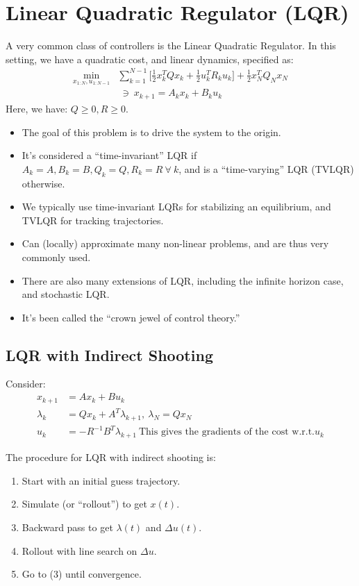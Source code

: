 \section{Linear Quadratic Regulator (LQR)}
A very common class of controllers is the Linear Quadratic Regulator. In this setting, we have a quadratic cost, and linear dynamics, specified as: 
\begin{align}
    \min_{x_{1:N}, u_{1:N-1}} &\sum_{k=1}^{N-1} \Big[ \frac{1}{2} x_k^T Q x_k + \frac{1}{2} u_k^T R_k u_k  \Big] + \frac{1}{2} x_N^T Q_N x_N \\
    & \ \ni \ x_{k+1} = A_k x_k + B_k u_k 
\end{align}
Here, we have: $Q \geq 0, R \geq 0$. 
\begin{itemize}
    \item The goal of this problem is to drive the system to the origin.
    \item It's considered a ``time-invariant'' LQR if $A_k=A, B_k=B, Q_k=Q, R_k=R \ \forall \ k$, and is a ``time-varying'' LQR (TVLQR) otherwise. 
    \item We typically use time-invariant LQRs for stabilizing an equilibrium, and TVLQR for tracking trajectories.
    \item Can (locally) approximate many non-linear problems, and are thus very commonly used. 
    \item There are also many extensions of LQR, including the infinite horizon case, and stochastic LQR. 
    \item It's been called the ``crown jewel of control theory.''
\end{itemize}

\subsection{LQR with Indirect Shooting}
Consider: 
\begin{align}
    x_{k+1} &= A x_k + B u_k \\
    \lambda_k &= Q x_k + A^T \lambda_{k+1}, \ \lambda_N = Q x_N \\
    u_{k} &= -R^{-1} B^T \lambda_{k+1} \ \textrm{This gives the gradients of the cost w.r.t.} u_k
\end{align}

The procedure for LQR with indirect shooting is: 
\begin{enumerate}
    \item Start with an initial guess trajectory. 
    \item Simulate (or ``rollout'') to get $x(t)$.
    \item Backward pass to get $\lambda(t)$ and $\Delta u(t)$.
    \item Rollout with line search on $\Delta u$.
    \item Go to (3) until convergence.
\end{enumerate}

